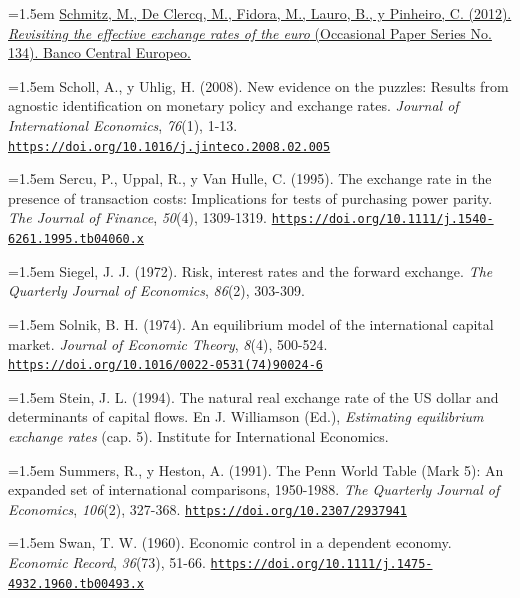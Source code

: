 \documentclass[10pt,a4paper]{article}
\begin{document}
\noindent\hangindent=1.5em \href{https://www.ecb.europa.eu/pub/pdf/scpops/ecbocp134.pdf}{Schmitz, M., De Clercq, M., Fidora, M., Lauro, B., y Pinheiro, C. (2012). \textit{Revisiting the effective exchange rates of the euro} (Occasional Paper Series No. 134). Banco Central Europeo.}

\noindent\hangindent=1.5em Scholl, A., y Uhlig, H. (2008). New evidence on the puzzles: Results from agnostic identification on monetary policy and exchange rates. \textit{Journal of International Economics}, \textit{76}(1), 1-13. \href{https://doi.org/10.1016/j.jinteco.2008.02.005}{\nolinkurl{https://doi.org/10.1016/j.jinteco.2008.02.005}}

\noindent\hangindent=1.5em Sercu, P., Uppal, R., y Van Hulle, C. (1995). The exchange rate in the presence of transaction costs: Implications for tests of purchasing power parity. \textit{The Journal of Finance}, \textit{50}(4), 1309-1319. \href{https://doi.org/10.1111/j.1540-6261.1995.tb04060.x}{\nolinkurl{https://doi.org/10.1111/j.1540-6261.1995.tb04060.x}}

\noindent\hangindent=1.5em Siegel, J. J. (1972). Risk, interest rates and the forward exchange. \textit{The Quarterly Journal of Economics}, \textit{86}(2), 303-309.

\noindent\hangindent=1.5em Solnik, B. H. (1974). An equilibrium model of the international capital market. \textit{Journal of Economic Theory}, \textit{8}(4), 500-524. \href{https://doi.org/10.1016/0022-0531(74)90024-6}{\nolinkurl{https://doi.org/10.1016/0022-0531(74)90024-6}}

\noindent\hangindent=1.5em Stein, J. L. (1994). The natural real exchange rate of the US dollar and determinants of capital flows. En J. Williamson (Ed.), \textit{Estimating equilibrium exchange rates} (cap. 5). Institute for International Economics.

\noindent\hangindent=1.5em Summers, R., y Heston, A. (1991). The Penn World Table (Mark 5): An expanded set of international comparisons, 1950-1988. \textit{The Quarterly Journal of Economics}, \textit{106}(2), 327-368. \href{https://doi.org/10.2307/2937941}{\nolinkurl{https://doi.org/10.2307/2937941}}

\noindent\hangindent=1.5em Swan, T. W. (1960). Economic control in a dependent economy. \textit{Economic Record}, \textit{36}(73), 51-66. \href{https://doi.org/10.1111/j.1475-4932.1960.tb00493.x}{\nolinkurl{https://doi.org/10.1111/j.1475-4932.1960.tb00493.x}}
\end{document}
